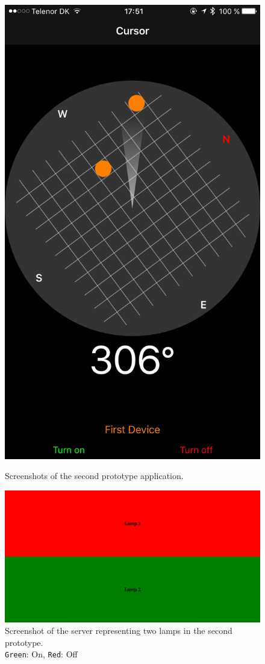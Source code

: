 \begin{figure}
{        \includegraphics[scale=0.15]{images/Prototype2_iOS_2.png}
    }
    \caption{Screenshots of the second prototype application.}
    \label{fig:prototype2-app-screenshots}
\end{figure}

\begin{figure}
    \centering
    \includegraphics[scale=0.2]{images/Prototype2_Server.png}
    \caption[caption]{Screenshot of the server representing two lamps in the second prototype.\\\texttt{Green}: On, \texttt{Red}: Off}
    \label{fig:prototype2-server-screenshot}
\end{figure}
